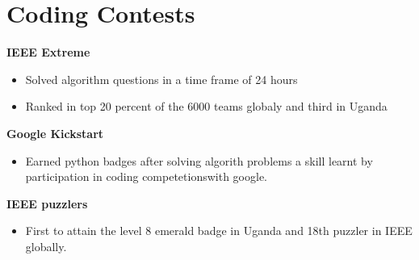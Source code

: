 \documentclass[a4paper]{article}
\begin{document}
\begin{minipage}[t]{0.5\textwidth}
        \section*{\bf Coding Contests}
        {\bf IEEE Extreme}
        \begin{itemize}
            \itemsep0em
            \item  Solved algorithm questions in a time frame of 24 hours
            \item Ranked in top 20 percent of the 6000 teams globaly and third in Uganda
        \end{itemize}

        {\bf Google Kickstart}
        \begin{itemize}
            \item Earned python badges after solving algorith problems a skill learnt by participation in coding competetionswith google.
        \end{itemize}

        {\bf IEEE puzzlers}
        \begin{itemize}
            \item First to attain the level 8 emerald badge in Uganda and 18th puzzler in IEEE globally.
        \end{itemize}

    \end{minipage}
    \hfil
\end{document}
